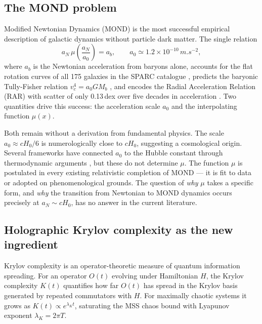 \documentclass[a4paper,11pt]{article}
\newcommand{\az}{a_0}                                %
\newcommand{\aN}{a_N}                                %
\newcommand{\ab}{a_b}                                %
\begin{document}
\subsection{The MOND problem}

Modified Newtonian Dynamics (MOND) \cite{Milgrom:1983a,Milgrom:1983b} is
the most successful empirical description of galactic dynamics without
particle dark matter.  The single relation
\begin{equation}
  \aN\,\mu\!\left(\frac{\aN}{\az}\right) = \ab,
  \qquad \az \simeq 1.2\times10^{-10}\,\si{m.s^{-2}},
  \label{eq:MOND}
\end{equation}
where $\ab$ is the Newtonian acceleration from baryons alone, accounts for
the flat rotation curves of all 175 galaxies in the SPARC catalogue
\cite{Lelli:2016}, predicts the baryonic Tully-Fisher relation
$v_c^4=\az G M_b$ \cite{Verheijen:2001,McGaugh:2005}, and encodes the
Radial Acceleration Relation (RAR) with scatter of only 0.13\,dex over
five decades in acceleration \cite{McGaugh:2016}.  Two quantities drive
this success: the acceleration scale $\az$ and the interpolating function
$\mu(x)$.

Both remain without a derivation from fundamental physics.  The scale
$\az\approx cH_0/6$ is numerologically close to $cH_0$, suggesting a
cosmological origin.  Several frameworks have connected $\az$ to the
Hubble constant through thermodynamic arguments
\cite{Milgrom:2023,Zhao:2010,Verlinde:2017}, but these do not determine
$\mu$.  The function $\mu$ is postulated in every existing relativistic
completion of MOND \cite{Skordis:2021,Bekenstein:2004,Deffayet:2011} ---
it is fit to data or adopted on phenomenological grounds.  The question of
\emph{why} $\mu$ takes a specific form, and \emph{why} the transition from
Newtonian to MOND dynamics occurs precisely at $\aN\sim cH_0$, has no
answer in the current literature.

\subsection{Holographic Krylov complexity as the new ingredient}

Krylov complexity \cite{Parker:2019,Avdoshkin:2022} is an operator-theoretic
measure of quantum information spreading.  For an operator $O(t)$ evolving
under Hamiltonian $H$, the Krylov complexity $K(t)$ quantifies how far
$O(t)$ has spread in the Krylov basis generated by repeated commutators
with $H$.  For maximally chaotic systems it grows as $K(t)\propto
e^{\lambda_K t}$, saturating the MSS chaos bound with Lyapunov exponent
$\lambda_K = 2\pi T$.
\end{document}
